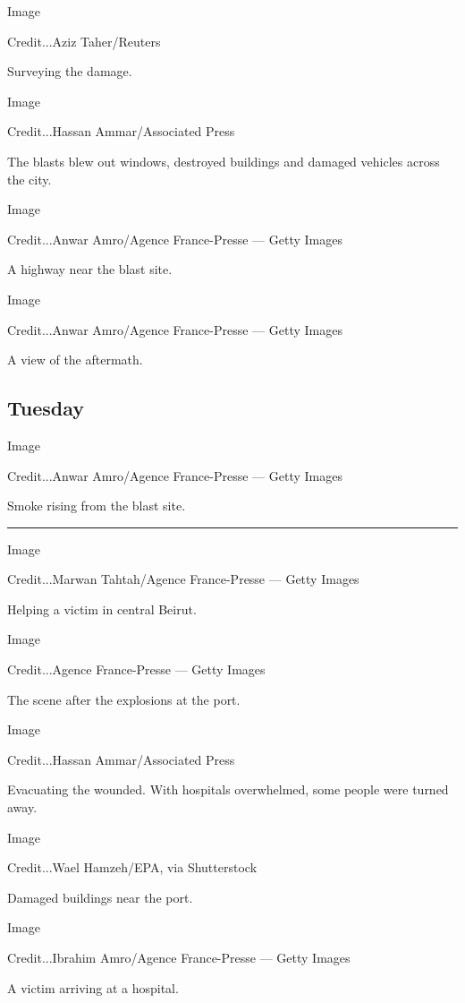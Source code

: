 Image

Credit...Aziz Taher/Reuters

Surveying the damage.

Image

Credit...Hassan Ammar/Associated Press

The blasts blew out windows, destroyed buildings and damaged vehicles
across the city.

Image

Credit...Anwar Amro/Agence France-Presse --- Getty Images

A highway near the blast site.

Image

Credit...Anwar Amro/Agence France-Presse --- Getty Images

A view of the aftermath.

\hypertarget{tuesday}{%
\subsection{Tuesday}\label{tuesday}}

Image

Credit...Anwar Amro/Agence France-Presse --- Getty Images

Smoke rising from the blast site.

\begin{center}\rule{0.5\linewidth}{\linethickness}\end{center}

Image

Credit...Marwan Tahtah/Agence France-Presse --- Getty Images

Helping a victim in central Beirut.

Image

Credit...Agence France-Presse --- Getty Images

The scene after the explosions at the port.

Image

Credit...Hassan Ammar/Associated Press

Evacuating the wounded. With hospitals overwhelmed, some people were
turned away.

Image

Credit...Wael Hamzeh/EPA, via Shutterstock

Damaged buildings near the port.

Image

Credit...Ibrahim Amro/Agence France-Presse --- Getty Images

A victim arriving at a hospital.

